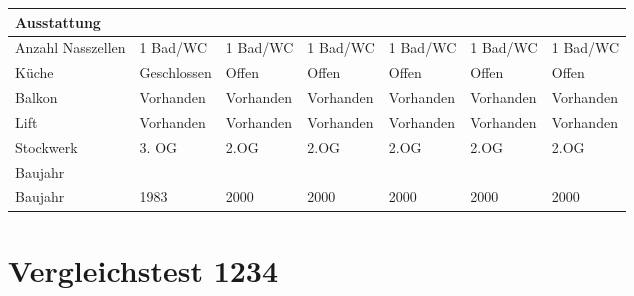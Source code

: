 \documentclass{article}
\begin{document}
\begin{table}[!htbp]
\begin{flushleft}
\begin{tabular}{ |l|l|l|l|l|l|l| }
				\hline
				\rowcolor{gray} Ausstattung & & & & & &  \\ 
				\hline
				Anzahl Nasszellen & \cellcolor{lightgray} 1 Bad/WC & 1 Bad/WC & 1 Bad/WC & 1 Bad/WC & 1 Bad/WC & 1 Bad/WC \\ 
				\hline
				Küche & \cellcolor{lightgray} Geschlossen & Offen & Offen & Offen & Offen & Offen \\ 
				\hline
				Balkon & \cellcolor{lightgray} Vorhanden & Vorhanden & Vorhanden & Vorhanden & Vorhanden & Vorhanden \\ 
				\hline
				Lift & \cellcolor{lightgray} Vorhanden & Vorhanden & Vorhanden & Vorhanden & Vorhanden & Vorhanden \\ 
				\hline
				Stockwerk & \cellcolor{lightgray} 3. OG & 2.OG & 2.OG & 2.OG & 2.OG & 2.OG \\ 
				\hline
				\rowcolor{gray} Baujahr & & & & & &  \\
				\hline
				Baujahr & \cellcolor{lightgray} 1983 & 2000 & 2000 & 2000 & 2000 & 2000\\ 
				\hline
			\end{tabular}
		\end{flushleft}
	\end{table}

	\clearpage
	\section{Vergleichstest 1234}
\end{document}
